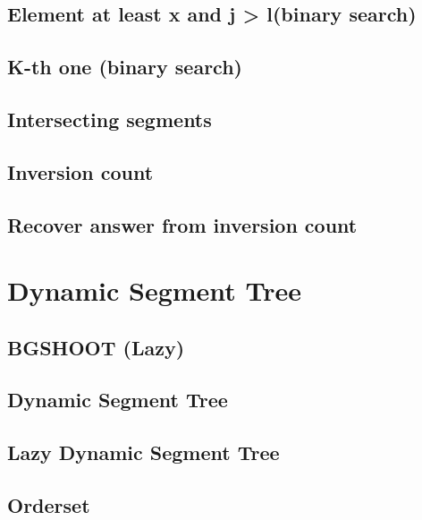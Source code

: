 \subsection{Element at least x and j > l(binary search)}
\raggedbottom
\hrulefill
\subsection{K-th one (binary search)}
\raggedbottom
\hrulefill
\subsection{Intersecting segments}
\raggedbottom
\hrulefill
\subsection{Inversion count}
\raggedbottom
\hrulefill
\subsection{Recover answer from inversion count}
\raggedbottom
\hrulefill

\section{Dynamic Segment Tree}
\subsection{BGSHOOT (Lazy)}
\raggedbottom
\hrulefill
\subsection{Dynamic Segment Tree}
\raggedbottom
\hrulefill
\subsection{Lazy Dynamic Segment Tree}
\raggedbottom
\hrulefill
\subsection{Orderset}
\raggedbottom
\hrulefill
